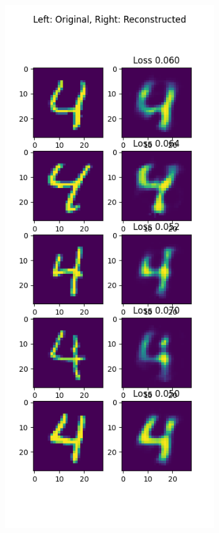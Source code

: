 \begin{solve}
\begin{figure}[H]
    \centering
    
    \begin{subfigure}{.5\textwidth}
      \centering
      \includegraphics[width=.9\linewidth]{plots/output_4.png}

\end{subfigure}
\end{figure}
\end{solve}
